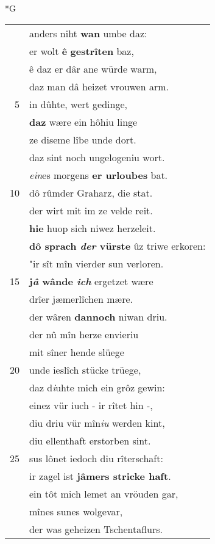 \documentclass[8pt,a4paper,notitlepage]{article}
\begin{document}
\begin{table}[ht]
\begin{minipage}[t]{0.5\linewidth}
\small
\begin{center}*G
\end{center}
\begin{tabular}{rl}
 & anders niht \textbf{wan} umbe daz:\\ 
 & er wolt \textbf{ê} \textbf{gestrîten} baz,\\ 
 & ê daz er dâr ane würde warm,\\ 
 & daz man dâ heizet vrouwen arm.\\ 
5 & in dûhte, wert gedinge,\\ 
 & \textbf{daz} wære ein hôhiu linge\\ 
 & ze diseme lîbe unde dort.\\ 
 & daz sint noch ungelogeniu wort.\\ 
 & \textit{ein}es morgens \textbf{er urloubes} bat.\\ 
10 & dô rûmder Graharz, die stat.\\ 
 & der wirt mit im ze velde reit.\\ 
 & \textbf{hie} huop sich niwez herzeleit.\\ 
 & \textbf{dô sprach \textit{der} vürste} ûz triwe erkoren:\\ 
 & "ir sît mîn vierder sun verloren.\\ 
15 & \textbf{j\textit{â} wânde \textit{ich}} ergetzet wære\\ 
 & drîer jæmerlîchen mære.\\ 
 & der wâren \textbf{dannoch} niwan driu.\\ 
 & der nû mîn herze envieriu\\ 
 & mit sîner hende slüege\\ 
20 & unde ieslîch stücke trüege,\\ 
 & daz d\textit{i}uhte mich ein grôz gewin:\\ 
 & einez vür iuch - ir rîtet hin -,\\ 
 & diu driu vür mîn\textit{iu} werden kint,\\ 
 & diu ellenthaft erstorben sint.\\ 
25 & sus lônet iedoch diu rîterschaft:\\ 
 & ir zagel ist \textbf{jâmers stricke haft}.\\ 
 & ein tôt mich lemet an vröuden gar,\\ 
 & mînes sunes wolgevar,\\ 
 & der was geheizen Tschentaflurs.\\ 

\end{tabular}
\end{minipage}
\end{table}
\end{document}
